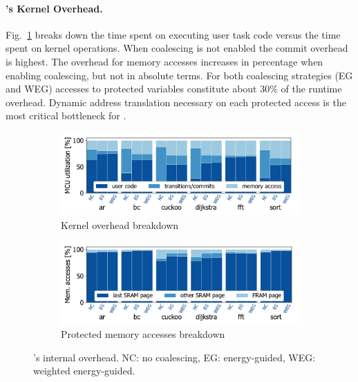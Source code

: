 \paragraph{\sys's Kernel Overhead.}
%
Fig.~\ref{fig:kernel-overhead} breaks down the time spent on executing 
user task code versus the time spent on kernel operations.
When coalescing is not enabled the commit overhead is highest.
%
The overhead for memory accesses increases in percentage when enabling coalescing,
but not in absolute terms.
%
For both coalescing strategies (EG and WEG) accesses to protected variables
constitute about 30\% of the runtime overhead. Dynamic address translation
necessary on each protected access is the most critical bottleneck for \sys.

\begin{figure}
    \begin{subfigure}{\columnwidth}
			\centering
        \includegraphics[width=.8\columnwidth]{figures/overallOverhead.pdf}
        \caption{Kernel overhead breakdown}
        \label{fig:kernel-overhead}
    \end{subfigure}
    \begin{subfigure}{\columnwidth}
			\centering
        \includegraphics[width=.8\columnwidth]{figures/memAccess}
        \caption{Protected memory accesses breakdown}
        \label{fig:mem-accesses}
    \end{subfigure}
    \caption{\sys's internal overhead. NC: no coalescing, EG:
    energy-guided, WEG: weighted energy-guided.}
    \label{fig:war}
\end{figure}

